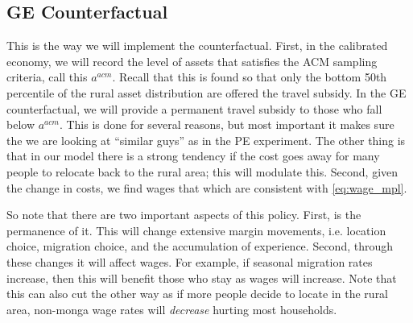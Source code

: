 \documentclass[pdftex,11pt]{article}
\begin{document}
\subsection{GE Counterfactual}

This is the way we will implement the counterfactual. First, in the calibrated economy, we will record the level of assets that satisfies the ACM sampling criteria, call this $a^{acm}$. Recall that this is found so that only the bottom 50th percentile of the rural asset distribution are offered the travel subsidy. In the GE counterfactual, we will provide a permanent travel subsidy to those who fall below $a^{acm}$. This is done for several reasons, but most important it makes sure the we are looking at ``similar guys'' as in the PE experiment. The other thing is that in our model there is a strong tendency if the cost goes away for many people to relocate back to the rural area; this will modulate this. Second, given the change in costs, we find wages that which are consistent with \ref{eq:wage_mpl}.

So note that there are two important aspects of this policy. First, is the permanence of it. This will change extensive margin movements, i.e. location choice, migration choice, and the accumulation of experience. Second, through these changes it will affect wages. For example, if seasonal migration rates increase, then this will benefit those who stay as wages will increase. Note that this can also cut the other way as if more people decide to locate in the rural area, non-monga wage rates will \emph{decrease} hurting most households.
\end{document}
